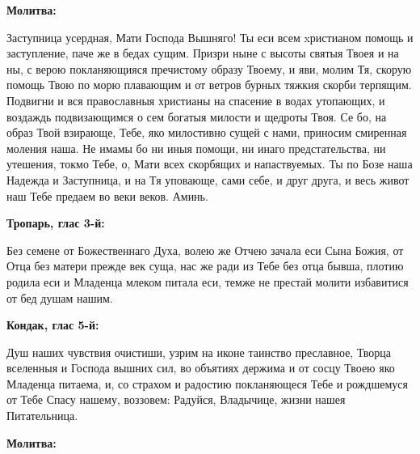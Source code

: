 \bigskip\bigskip\mychapterending

 


\bfseries Молитва:\normalfont{}\nopagebreak


Заступница усердная, Мати Господа Вышняго! Ты еси всем xристианом помощь и заступление, паче же в бедах сущим. Призри ныне с высоты святыя Твоея и на ны, с верою покланяющияся пречистому образу Твоему, и яви, молим Тя, скорую помощь Твою по морю плавающим и от ветров бурных тяжкия скорби терпящим. Подвигни и вся православныя христианы на спасение в водах утопающих, и воздаждь подвизающимся о сем богатыя милости и щедроты Твоя. Се бо, на образ Твой взирающе, Тебе, яко милостивно сущей с нами, приносим смиренная моления наша. Не имамы бо ни иныя помощи, ни инаго предстательства, ни утешения, токмо Тебе, о, Мати всех скорбящих и напаствуемых. Ты по Бозе наша Надежда и Заступница, и на Тя уповающе, сами себе, и друг друга, и весь живот наш Тебе предаем во веки веков. Аминь.


\bigskip\bigskip\mychapterending

 

\bfseries Тропарь, глас 3-й:\normalfont{}\nopagebreak


Без семене от Божественнаго Духа, волею же Отчею зачала еси Сына Божия, от Отца без матери прежде век суща, нас же ради из Тебе без отца бывша, плотию родила еси и Младенца млеком питала еси, темже не престай молити избавитися от бед душам нашим.


\medskip


\bfseries Кондак, глас 5-й:\normalfont{}\nopagebreak


Душ наших чувствия очистиши, узрим на иконе таинство преславное, Творца вселенныя и Господа вышних сил, во объятиях держима и от сосцу Твоею яко Младенца питаема, и, со страхом и радостию покланяющеся Тебе и рождшемуся от Тебе Спасу нашему, воззовем: Радуйся, Владычице, жизни нашея Питательница.


\medskip


\bfseries Молитва:\normalfont{}\nopagebreak


